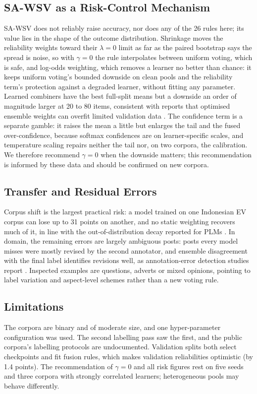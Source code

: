 \documentclass[conference,a4paper]{IEEEtran}
\newcommand{\rc}{SA\mbox{-}WSV}
\begin{document}
\subsection{\rc{} as a Risk-Control Mechanism}
\rc{} does not reliably raise accuracy, nor does any of the 26 rules here; its value lies in the shape of the outcome distribution. Shrinkage moves the reliability weights toward their $\lambda=0$ limit as far as the paired bootstrap says the spread is noise, so with $\gamma=0$ the rule interpolates between uniform voting, which is safe, and log-odds weighting, which removes a learner no better than chance: it keeps uniform voting's bounded downside on clean pools and the reliability term's protection against a degraded learner, without fitting any parameter. Learned combiners have the best full-split means but a downside an order of magnitude larger at 20 to 80 items, consistent with reports that optimised ensemble weights can overfit limited validation data \cite{purucker2023}. The confidence term is a separate gamble: it raises the mean a little but enlarges the tail and the fused over-confidence, because softmax confidences are on learner-specific scales, and temperature scaling repairs neither the tail nor, on two corpora, the calibration. We therefore recommend $\gamma=0$ when the downside matters; this recommendation is informed by these data and should be confirmed on new corpora.

\subsection{Transfer and Residual Errors}
Corpus shift is the largest practical risk: a model trained on one Indonesian EV corpus can lose up to 31 points on another, and no static weighting recovers much of it, in line with the out-of-distribution decay reported for PLMs \cite{yang2023}. In domain, the remaining errors are largely ambiguous posts: posts every model misses were mostly revised by the second annotator, and ensemble disagreement with the final label identifies revisions well, as annotation-error detection studies report \cite{klie2023}. Inspected examples are questions, adverts or mixed opinions, pointing to label variation \cite{plank2022} and aspect-level schemes \cite{canavara2025, nugroho2024zero} rather than a new voting rule.

\subsection{Limitations}
The corpora are binary and of moderate size, and one hyper-parameter configuration was used. The second labelling pass saw the first, and the public corpora's labelling protocols are undocumented. Validation splits both select checkpoints and fit fusion rules, which makes validation reliabilities optimistic (by 1.4 points). The recommendation of $\gamma=0$ and all risk figures rest on five seeds and three corpora with strongly correlated learners; heterogeneous pools may behave differently.
\end{document}
